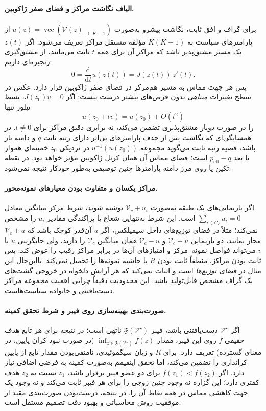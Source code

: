 \paragraph{الیاف نگاشت مراکز و فضای صفر ژاکوبین.}
برای گراف و افق ثابت،
نگاشت پیشرو به‌صورت
$u(z)=\operatorname{vec}(\mathcal V(z)_{:,1:K-1})$
از پارامترهای سیاست
به $K(K-1)$ مؤلفه
مستقل مراکز تعریف می‌شود.
اگر $z(t)$ یک مسیر
مشتق‌پذیر باشد که
مراکز آن برای همه $t$
ثابت می‌مانند، از
مشتق‌گیری زنجیره‌ای داریم:
\[
0=\frac{\mathrm d}{\mathrm dt}u(z(t))
=J(z(t))\,z'(t).
\]
پس هر جهت مماس
به مسیر هم‌مرکز
در فضای صفر ژاکوبین
قرار دارد. عکس
در سطح تغییرات
\emph{متناهی} بدون
فرض‌های بیشتر درست نیست:
اگر $J(z_0)v=0$،
بسط تیلور تنها
\[
u(z_0+tv)
=u(z_0)+O(t^2)
\]
را در صورت
دوبار مشتق‌پذیری
تضمین می‌کند،
نه برابری دقیق مراکز
برای $t\ne0$.
در همسایگی‌ای که
نگاشت پس از حذف
پارامترهای بی‌اثر
دارای رتبه ثابت $q$
و دامنه باز باشد،
قضیه رتبه ثابت
می‌گوید مجموعه
$u^{-1}(u(z_0))$
در نزدیکی $z_0$
خمینه‌ای هموار با
بعد $p_{\mathrm{eff}}-q$
است؛ فضای مماس آن
همان کرنل ژاکوبین
مؤثر خواهد بود.
در نقطه تکین یا
روی مرز دامنه پارامترها
چنین توصیفی به‌طور
خودکار نتیجه نمی‌شود.

\paragraph{مراکز یکسان و متفاوت بودن معیارهای نمونه‌محور.}
اگر بازنمایی‌های یک
طبقه به‌صورت
$\mathcal V_c+u_i$
نوشته شوند، شرط
مرکز میانگین معادل
$\sum_{i\in C_c}u_i=0$
است. این شرط به‌تنهایی
شعاع یا پراکندگی
مقادیر $u_i$ را
مشخص نمی‌کند؛
مثلاً در فضای توزیع‌های
داخل سیمپلکس، اگر
$u$ آن‌قدر کوچک باشد
که $\mathcal V_c\pm u$
مجاز بمانند،
دو بازنمایی
$\mathcal V_c+u$ و
$\mathcal V_c-u$
همان میانگین
$\mathcal V_c$ را دارند،
ولی جایگزینی $u$
با $v$ می‌تواند
فواصل نمونه--مرکز
و امتیازهای آن‌ها
در برابر مراکز
رقیب را عوض کند.
پس ثابت بودن مراکز،
منطقاً ثابت بودن
$R$ یا حاشیه
نمونه‌ها را تحمیل
نمی‌کند. بااین‌حال
این مثال در
\emph{فضای توزیع‌ها}
است و اثبات نمی‌کند
که هر آرایش دلخواه
در خروجی گشت‌های
یک گراف مشخص
قابل‌تولید باشد.
این محدودیت دقیقاً
چرایی اهمیت مجموعه
مراکز دست‌یافتنی
و خانواده سیاست‌هاست.

\paragraph{صورت‌بندی بهینه‌سازی روی فیبر و شرط تحقق کمینه.}
اگر $\mathcal V^\star$ دست‌یافتنی باشد، فیبر
$\mathfrak F(\mathcal V^\star)$ ناتهی است؛ در نتیجه برای
هر تابع هدف حقیقی $f$ روی این فیبر، مقدار
$\inf_{z\in\mathfrak F(\mathcal V^\star)} f(z)$
(در صورت نبود کران پایین، در معنای گسترده) تعریف دارد.
برای $R$ و زیان سیگموئیدی، نامنفی‌بودن مقدار تابع
از پایین کرانداری را تضمین می‌کند، اما تحقق اینفیمم
به‌صورت کمینه به فرضی اضافی نیاز دارد.
اگر $f(z_1)<f(z_2)$ برای دو عضو فیبر برقرار باشد،
$z_1$ نسبت به $z_2$ هدف کمتری دارد؛ این گزاره
نه وجود چنین زوجی را برای هر فیبر ثابت می‌کند
و نه وجود یک جهت کاهشی مماس در همه نقاط آن را.
در نتیجه، درست‌بودن صورت‌بندی مقید از موفقیت
روش محاسباتی و بهبود دقت تصمیم مستقل است.

